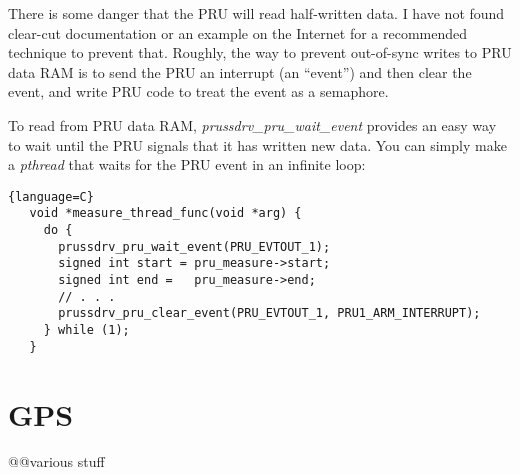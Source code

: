 \documentclass[letterpaper,11pt,fleqn]{article}
\begin{document}
There is some danger that the PRU will read half-written data. I have not
found clear-cut documentation or an example on the Internet for a recommended
technique to prevent that. Roughly, the way to prevent out-of-sync writes to
PRU data RAM is to send the PRU an interrupt (an ``event'') and then clear the
event, and write PRU code to treat the event as a semaphore.

To read from PRU data RAM, \textit{prussdrv\_pru\_wait\_event} provides an
easy way to wait until the PRU signals that it has written new data. You can
simply make a \textit{pthread} that waits for the PRU event in an infinite
loop:

\begin{lstlisting}{language=C}
   void *measure_thread_func(void *arg) {
     do {
       prussdrv_pru_wait_event(PRU_EVTOUT_1);
       signed int start = pru_measure->start;
       signed int end =   pru_measure->end;
       // . . .
       prussdrv_pru_clear_event(PRU_EVTOUT_1, PRU1_ARM_INTERRUPT);
     } while (1);
   }
\end{lstlisting}

\section{GPS}

@@various stuff
\end{document}
